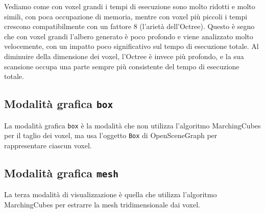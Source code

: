 Vediamo come con voxel grandi i tempi di esecuzione sono molto ridotti e molto simili, con poca occupazione di memoria, mentre con voxel più piccoli i tempi crescono compatibilmente con un fattore 8 (l'arietà dell'Octree). Questo è segno che con voxel grandi l'albero generato è poco profondo e viene analizzato molto velocemente, con un impatto poco significativo sul tempo di esecuzione totale. Al diminuire della dimensione dei voxel, l'Octree è invece più profondo, e la sua scansione occupa una parte sempre più consistente del tempo di esecuzione totale.%

\subsection{Modalità grafica \texttt{box}}
La modalità grafica \texttt{box} è la modalità che non utilizza l'algoritmo MarchingCubes per il taglio dei voxel, ma usa l'oggetto \texttt{Box} di OpenSceneGraph per rappresentare ciascun voxel.

\subsection{Modalità grafica \texttt{mesh}}
La terza modalità di visualizzazione è quella che utilizza l'algoritmo MarchingCubes per estrarre la mesh tridimensionale dai voxel.

